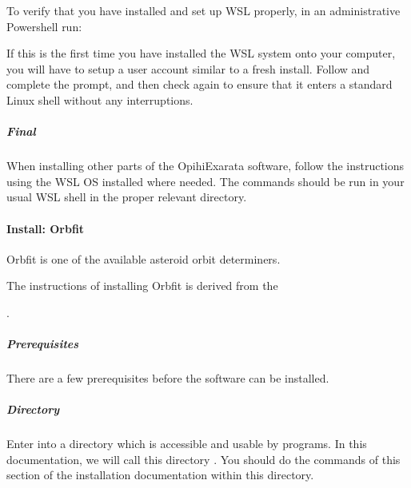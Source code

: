 \documentclass[letterpaper,11pt,english]{sphinxmanual}
\begin{document}
\sphinxAtStartPar
To verify that you have installed and set up WSL properly, in an administrative Powershell run:

\begin{sphinxVerbatim}[commandchars=\\\{\}]
\end{sphinxVerbatim}

\sphinxAtStartPar
If this is the first time you have installed the WSL system onto your computer,
you will have to setup a user account similar to a fresh install. Follow and
complete the prompt, and then check  again to ensure that it enters a
standard Linux shell without any interruptions.


\subparagraph{Final}
\label{\detokenize{technical/installation/windows:final}}
\sphinxAtStartPar
When installing other parts of the OpihiExarata software, follow the
instructions using the WSL OS installed where needed. The commands should be
run in your usual WSL shell in the proper relevant directory.

\sphinxstepscope


\paragraph{Install: Orbfit}
\label{\detokenize{technical/installation/orbfit:install-orbfit}}\label{\detokenize{technical/installation/orbfit:technical-installation-orbfit}}\label{\detokenize{technical/installation/orbfit::doc}}
\sphinxAtStartPar
Orbfit is one of the available asteroid orbit determiners.

\sphinxAtStartPar
The instructions of installing Orbfit is derived from the
%
\begin{footnote}[36]\sphinxAtStartFootnote
{}
%
\end{footnote}.


\subparagraph{Prerequisites}
\label{\detokenize{technical/installation/orbfit:prerequisites}}
\sphinxAtStartPar
There are a few prerequisites before the software can be installed.


\subparagraph{Directory}
\label{\detokenize{technical/installation/orbfit:directory}}
\sphinxAtStartPar
Enter into a directory which is accessible and usable by programs. In this
documentation, we will call this directory . You should do the
commands of this section of the installation documentation within this
directory.
\end{document}
